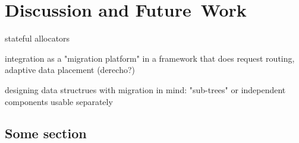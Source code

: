 \chapter{Discussion and Future~Work}
\label{chap:discussionfuture}

stateful allocators

integration as a "migration platform" in a framework that does request routing,
adaptive data placement (derecho?)

designing data structrues with migration in mind: "sub-trees" or independent
components usable separately

\section{Some section}
